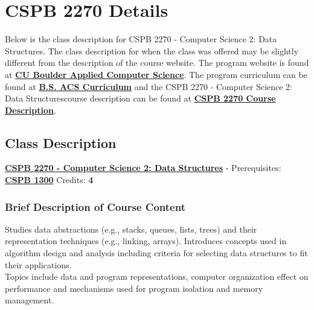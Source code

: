\newcommand{\CSPBDataStruct}{CSPB 2270 - Computer Science 2: Data Structures}

\chapter{CSPB 2270 Details}
Below is the class description for \CSPBDataStruct. The class description for when the class was offered may be slightly different from the description of the course website. The program website is found at \href{https://www.colorado.edu/program/cspb/}{\textbf{CU Boulder Applied Computer Science}}. The program curriculum can be found at \href{https://www.colorado.edu/program/cspb/academics/curriculum-course-list}{\textbf{B.S. ACS Curriculum}} and the \CSPBDataStruct course description can be found at \href{https://www.colorado.edu/program/cspb/cspb-2270-computer-science-2-data-structures}{\textbf{CSPB 2270 Course Description}}.

\section{Class Description}
\horizontalline
\noindent \href{https://www.colorado.edu/program/cspb/cspb-2270-computer-science-2-data-structures}{\textbf{\CSPBDataStruct}} - Prerequisites: \href{https://www.colorado.edu/program/cspb/cspb-1300-computer-science-1-starting-computing}{\textbf{CSPB 1300}} Credits: \textbf{4}
\subsection{Brief Description of Course Content}
Studies data abstractions (e.g., stacks, queues, lists, trees) and their representation techniques (e.g., linking, arrays). Introduces concepts used in algorithm design and analysis including criteria for selecting data structures to fit their applications. \\ 

\noindent Topics include data and program representations, computer organization effect on performance and mechanisms used for program isolation and memory management. \\

